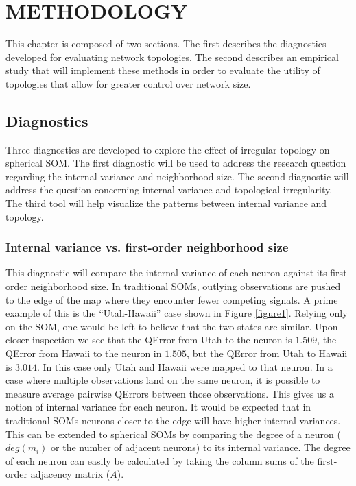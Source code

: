\chapter{METHODOLOGY}
This chapter is composed of two sections.  The first describes the diagnostics
developed for evaluating network topologies.  The second describes an
empirical study that will implement these methods in order to evaluate the
utility of topologies that allow for greater control over network size.

\section{Diagnostics}
Three diagnostics are developed to explore the effect of irregular topology on
spherical SOM.  The first diagnostic will be used to address the research
question regarding the internal variance and neighborhood size.  The second
diagnostic will address the question concerning internal variance and
topological irregularity.  The third tool will help visualize the patterns
between internal variance and topology.

\subsection{Internal variance vs. first-order neighborhood size}
\label{q1}
This diagnostic will compare the internal variance of each neuron against its
first-order neighborhood size.  In traditional SOMs, outlying observations are
pushed to the edge of the map where they encounter fewer competing signals. A
prime example of this is the ``Utah-Hawaii'' case shown in Figure
\ref{figure1}.  Relying only on the SOM, one would be left to believe that the
two states are similar. Upon closer inspection we see that the QError from
Utah to the neuron is $1.509$, the QError from Hawaii to the neuron in
$1.505$, but the QError from Utah to Hawaii is $3.014$. In this case only Utah
and Hawaii were mapped to that neuron.  In a case where multiple observations
land on the same neuron, it is possible to measure average pairwise QErrors
between those observations.  This gives us a notion of internal variance for
each neuron. It would be expected that in traditional SOMs neurons closer to
the edge will have higher internal variances. This can be extended to
spherical SOMs by comparing the degree of a neuron ($deg(m_i)$ or the number of
adjacent neurons) to its internal variance.  The degree of each neuron can
easily be calculated by taking the column sums of the first-order adjacency
matrix ($A$).

